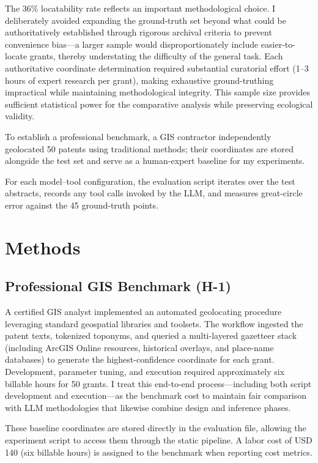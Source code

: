 The 36\% locatability rate reflects an important methodological choice.
I deliberately avoided expanding the ground-truth set beyond what could
be authoritatively established through rigorous archival criteria to
prevent convenience bias---a larger sample would disproportionately
include easier-to-locate grants, thereby understating the difficulty of
the general task. Each authoritative coordinate determination required
substantial curatorial effort (1--3 hours of expert research per grant),
making exhaustive ground-truthing impractical while maintaining
methodological integrity. This sample size provides sufficient
statistical power for the comparative analysis while preserving
ecological validity.

To establish a professional benchmark, a GIS contractor independently
geolocated 50 patents using traditional methods; their coordinates are
stored alongside the test set and serve as a human-expert baseline for
my experiments.

For each model--tool configuration, the evaluation script iterates over
the test abstracts, records any tool calls invoked by the LLM, and
measures great-circle error against the 45 ground-truth points.

\section{Methods}\label{methods}

\subsection{Professional GIS Benchmark
(H-1)}\label{professional-gis-benchmark-h-1}

A certified GIS analyst \citep{Bashorun2025_gis} implemented an
automated geolocating procedure leveraging standard geospatial libraries
and toolsets. The workflow ingested the patent texts, tokenized
toponyms, and queried a multi-layered gazetteer stack (including ArcGIS
Online resources, historical overlays, and place-name databases) to
generate the highest-confidence coordinate for each grant. Development,
parameter tuning, and execution required approximately six billable
hours for 50 grants. I treat this end-to-end process---including both
script development and execution---as the benchmark cost to maintain
fair comparison with LLM methodologies that likewise combine design and
inference phases.

These baseline coordinates are stored directly in the evaluation file,
allowing the experiment script to access them through the static
pipeline. A labor cost of USD 140 (six billable hours) is assigned to
the benchmark when reporting cost metrics.

